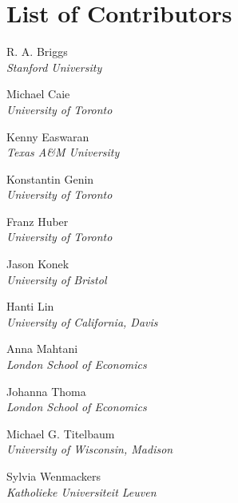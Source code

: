 
\bigskip

\begingroup
\let\clearpage\relax
\let\cleardoublepage\relax
\let\cleardoublepage\relax
\chapter*{List of Contributors}

\noindent R. A. Briggs\\
{\itshape Stanford University}
\setlength{\parskip}{\baselineskip}

\noindent Michael Caie\\
{\itshape University of Toronto}

\noindent Kenny Easwaran\\
{\itshape Texas A\&M University}

\noindent Konstantin Genin\\
{\itshape University of Toronto}

\noindent Franz Huber\\
{\itshape University of Toronto}

\noindent Jason Konek\\
{\itshape University of Bristol}

\noindent Hanti Lin\\
{\itshape University of California, Davis}

\noindent Anna Mahtani\\
{\itshape London School of Economics}

\noindent Johanna Thoma\\
{\itshape London School of Economics}

\noindent Michael G. Titelbaum\\
{\itshape University of Wisconsin, Madison}

\noindent Sylvia Wenmackers\\
{\itshape Katholieke Universiteit Leuven}

\endgroup
